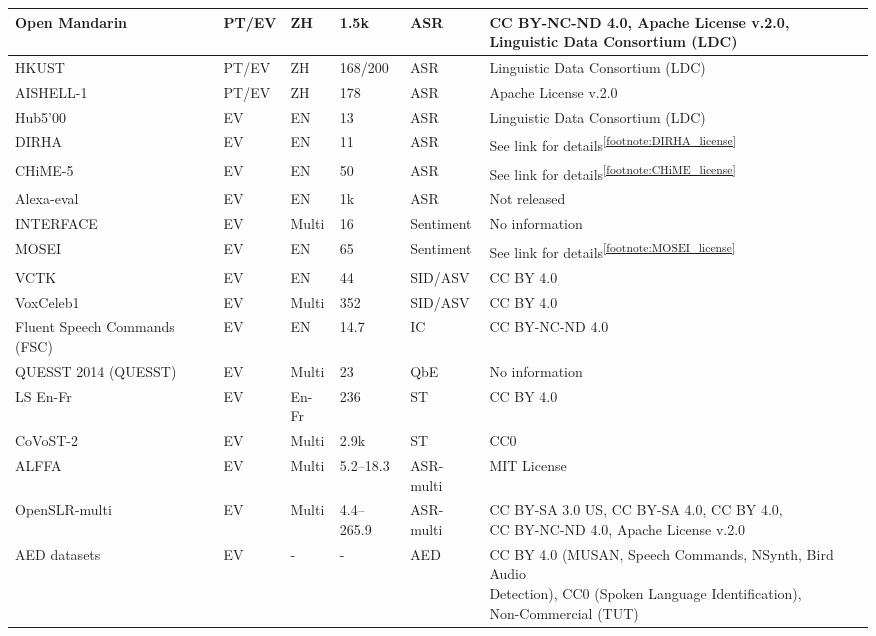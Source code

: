 \begin{table*}[ht]
{{\begin{tabular}{llllll}
    Open Mandarin & PT/EV & ZH & 1.5k & ASR & \makecell[l]{CC BY-NC-ND 4.0, Apache License v.2.0,\\ Linguistic Data Consortium (LDC)} \\ \hline %
    HKUST & PT/EV & ZH & 168/200 & ASR & Linguistic Data Consortium (LDC) \\ \hline %
    AISHELL-1 & PT/EV & ZH & 178 & ASR & Apache License v.2.0 \\ \hline %
    Hub5'00 & EV & EN & 13 & ASR & Linguistic Data Consortium (LDC) \\ \hline %
    DIRHA & EV & EN & 11 & ASR & See link for details\textsuperscript{\ref{footnote:DIRHA_license}} \\ \hline %
    CHiME-5 & EV & EN & 50 & ASR & See link for details\textsuperscript{\ref{footnote:CHiME_license}}\\ \hline %
    Alexa-eval & EV & EN & 1k & ASR & Not released \\ \hline %
    INTERFACE & EV & Multi & 16 & Sentiment & No information \\ \hline %
    MOSEI & EV & EN & 65 & Sentiment & See link for details\textsuperscript{\ref{footnote:MOSEI_license}}\\ \hline %
    VCTK & EV & EN & 44 & SID/ASV & CC BY 4.0 \\ \hline %
    VoxCeleb1 & EV & Multi & 352 & SID/ASV & CC BY 4.0 \\ \hline
    Fluent Speech Commands (FSC) & EV & EN & 14.7 & IC & CC BY-NC-ND 4.0 \\ \hline
    QUESST 2014 (QUESST) & EV & Multi & 23 & QbE & No information \\ \hline
    LS En-Fr & EV & En-Fr & 236 & ST & CC BY 4.0 \\ \hline %
    CoVoST-2 & EV & Multi & 2.9k & ST & CC0 \\ \hline

    ALFFA & EV & Multi & 5.2--18.3 & ASR-multi & MIT License \\ \hline %
    OpenSLR-multi & EV & Multi & 4.4--265.9 & ASR-multi & \makecell[l]{CC BY-SA 3.0 US, CC BY-SA 4.0, CC BY 4.0, \\ CC BY-NC-ND 4.0, Apache License v.2.0}\\ \hline %
    AED datasets & EV & - & - & AED & \makecell[l]{CC BY 4.0 (MUSAN, Speech Commands, NSynth, Bird Audio\\ Detection),  CC0 (Spoken Language Identification),\\ Non-Commercial (TUT)} \\
    \bottomrule
  \end{tabular}}}
\end{table*}


